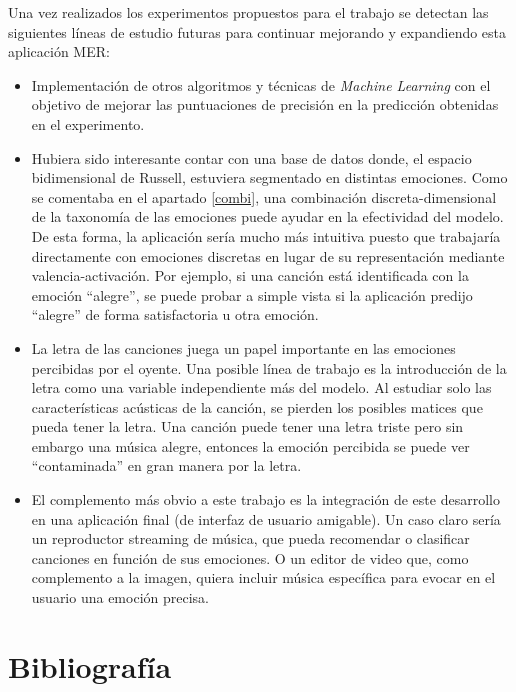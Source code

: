 \documentclass[12pt,a4paper]{article}
\begin{document}
Una vez realizados los experimentos propuestos para el trabajo se detectan las siguientes líneas de estudio futuras para continuar mejorando y expandiendo esta aplicación MER:
\begin{itemize}
	\item Implementación de otros algoritmos y técnicas de \textit{Machine Learning} con el objetivo de mejorar las puntuaciones de precisión en la predicción obtenidas en el experimento.
	\item Hubiera sido interesante contar con una base de datos donde, el espacio bidimensional de Russell, estuviera segmentado en distintas emociones. Como se comentaba en el apartado \ref{combi}, una combinación discreta-dimensional de la taxonomía de las emociones puede ayudar en la efectividad del modelo. De esta forma, la aplicación sería mucho más intuitiva puesto que trabajaría directamente con emociones discretas en lugar de su representación mediante valencia-activación. Por ejemplo, si una canción está identificada con la emoción ``alegre'', se puede probar a simple vista si la aplicación predijo ``alegre'' de forma satisfactoria u otra emoción.
	\item La letra de las canciones juega un papel importante en las emociones percibidas por el oyente. Una posible línea de trabajo es la introducción de la letra como una variable independiente más del modelo. Al estudiar solo las características acústicas de la canción, se pierden los posibles matices que pueda tener la letra. Una canción puede tener una letra triste pero sin embargo una música alegre, entonces la emoción percibida se puede ver ``contaminada'' en gran manera por la letra.
	\item El complemento más obvio a este trabajo es la integración de este desarrollo en una aplicación final (de interfaz de usuario amigable). Un caso claro sería un reproductor streaming de música, que pueda recomendar o clasificar canciones en función de sus emociones. O un editor de video que, como complemento a la imagen, quiera incluir música específica para evocar en el usuario una emoción precisa.
\end{itemize}





\newpage
\section{Bibliografía}
\printbibliography[heading=none]
\end{document}

